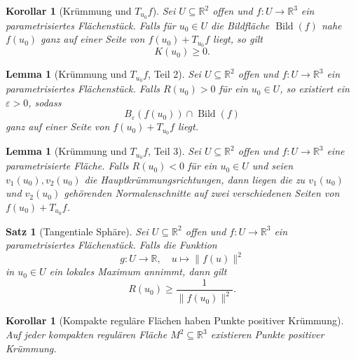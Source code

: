 \documentclass[a4paper,12pt]{article}
\theoremstyle{break}
\newtheorem{theorem}[definition]{Satz}
\newtheorem{lemma}[definition]{Lemma}
\newtheorem{corollary}[definition]{Korollar}
\begin{document}
\begin{corollary}[Krümmung und \( T_{u_0} f \)]
Sei \( U \subseteq \mathbb{R}^2 \) offen und \( f: U \to \mathbb{R}^3 \) ein parametrisiertes Flächenstück.  
Falls für \( u_0 \in U \) die Bildfläche \( \operatorname{Bild}(f) \) nahe \( f(u_0) \) ganz auf einer Seite von \( f(u_0) + T_{u_0} f \) liegt, so gilt  
\[
K(u_0) \geq 0.
\]
\end{corollary}

\begin{lemma}[Krümmung und \( T_{u_0} f \), Teil 2]
Sei \( U \subseteq \mathbb{R}^2 \) offen und \( f: U \to \mathbb{R}^3 \) ein parametrisiertes Flächenstück.  
Falls \( R(u_0) > 0 \) für ein \( u_0 \in U \), so existiert ein \( \varepsilon > 0 \), sodass  
\[
B_{\varepsilon}(f(u_0)) \cap \operatorname{Bild}(f)
\]
ganz auf einer Seite von \( f(u_0) + T_{u_0} f \) liegt.
\end{lemma}

\begin{lemma}[Krümmung und \( T_{u_0} f \), Teil 3]
Sei \( U \subseteq \mathbb{R}^2 \) offen und \( f: U \to \mathbb{R}^3 \) eine parametrisierte Fläche.  
Falls \( R(u_0) < 0 \) für ein \( u_0 \in U \) und seien \( v_1(u_0), v_2(u_0) \) die Hauptkrümmungsrichtungen,  
dann liegen die zu \( v_1(u_0) \) und \( v_2(u_0) \) gehörenden Normalenschnitte auf zwei verschiedenen Seiten von \( f(u_0) + T_{u_0} f \).
\end{lemma}

\begin{theorem}[Tangentiale Sphäre]
Sei \( U \subseteq \mathbb{R}^2 \) offen und \( f: U \to \mathbb{R}^3 \) ein parametrisiertes Flächenstück.  
Falls die Funktion  
\[
g: U \to \mathbb{R}, \quad u \mapsto \| f(u) \|^2
\]
in \( u_0 \in U \) ein lokales Maximum annimmt, dann gilt  
\[
R(u_0) \geq \frac{1}{\| f(u_0) \|^2}.
\]
\end{theorem}

\begin{corollary}[Kompakte reguläre Flächen haben Punkte positiver Krümmung]
Auf jeder kompakten regulären Fläche \( M^2 \subseteq \mathbb{R}^3 \) existieren Punkte positiver Krümmung.
\end{corollary}
\end{document}
